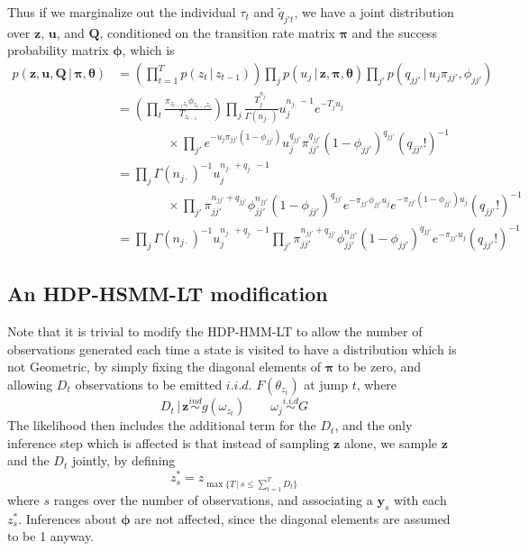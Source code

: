 \documentclass[12pt,letterpaper]{report}
\newcommand{\given}{\, \vert \,}
\newcommand{\by}{\mathbf{y}}
\newcommand{\bQ}{\mathbf{Q}}
\newcommand{\bz}{\mathbf{z}}
\newcommand{\bu}{\mathbf{u}}
\newcommand{\btheta}{\boldsymbol{\theta}}
\newcommand{\bpi}{\boldsymbol{\pi}}
\newcommand{\bphi}{\boldsymbol{\phi}}
\begin{document}
Thus if we marginalize out the individual $\tau_t$ and
$\tilde{q}_{j't}$, we have a joint distribution
over $\bz$, $\bu$, and $\bQ$, conditioned on the transition rate
matrix $\bpi$ and the success probability matrix $\bphi$, which is
\begin{align}
  \label{eq:54}
  p(\bz, \bu, \bQ \given \bpi, \btheta) &= \left(\prod_{t=1}^T p(z_{t} \given
    z_{t-1})\right) \prod_{j} p(u_j \given \bz, \bpi, \btheta)
  \prod_{j'} p(q_{jj'} \given u_j \pi_{jj'}, \phi_{jj'}) \\
  &= \left(\prod_{t} \frac{\pi_{z_{t-1}z_t}\phi_{z_{t-1}z_t}}{T_{z_{t-1}}}\right) \prod_{j}
  \frac{T_j^{n_{j\cdot}}}{\Gamma(n_{j\cdot})} u_j^{n_{j\cdot} - 1}
  e^{-T_j u_j} \\ &\qquad\qquad\times
  \prod_{j'} e^{-u_j\pi_{jj'}(1-\phi_{jj'})} u_j^{q_{jj'}}
  \pi_{jj'}^{q_{jj'}} (1-\phi_{jj'})^{q_{jj'}} (q_{jj'}!)^{-1} \\
  &= \prod_{j} \Gamma(n_{j\cdot})^{-1} u_j^{n_{j\cdot} + q_{j\cdot}-1}
  \\ &\qquad\qquad \times \prod_{j'}
  \pi_{jj'}^{n_{jj'} + q_{jj'}} \phi_{jj'}^{n_{jj'}}
  (1-\phi_{jj'})^{q_{jj'}} e^{-\pi_{jj'}\phi_{jj'}u_j}
  e^{-\pi_{jj'}(1-\phi_{jj'})u_j} (q_{jj'}!)^{-1} \\
  &\label{eq:joint-likelihood} = \prod_{j} \Gamma(n_{j\cdot})^{-1} u_j^{n_{j\cdot} + q_{j\cdot}-1} \prod_{j'}
  \pi_{jj'}^{n_{jj'} + q_{jj'}} \phi_{jj'}^{n_{jj'}}
  (1-\phi_{jj'})^{q_{jj'}} e^{-\pi_{jj'}u_j} (q_{jj'}!)^{-1}
\end{align}

\subsection{An HDP-HSMM-LT modification}
\label{sec:an-hsmm-modification}

Note that it is trivial to modify the HDP-HMM-LT to allow the
number of observations generated each time a state is visited to have
a distribution which is not Geometric, by simply fixing the diagonal
elements of $\bpi$ to be zero, and allowing $D_t$ observations to be
emitted $i.i.d.$ $F(\theta_{z_t})$ at jump $t$, where
\begin{equation}
  \label{eq:95}
  D_t \given \bz \stackrel{ind}{\sim} g(\omega_{z_t}) \qquad \omega_j
  \stackrel{i.i.d}{\sim} G
\end{equation}
The likelihood then includes the additional term for the $D_t$, and
the only inference step which is affected is that instead of sampling
$\bz$ alone, we sample $\bz$ and the $D_t$ jointly, by defining
\begin{equation}
  z^*_s = z_{\max\{T \given s \leq \sum_{t=1}^T D_t\}}
\end{equation}
where $s$ ranges over the number of observations, 
and associating a $\by_s$ with each $z^*_s$.
Inferences about $\bphi$ are not affected, since the diagonal
elements are assumed to be 1 anyway.
\end{document}
